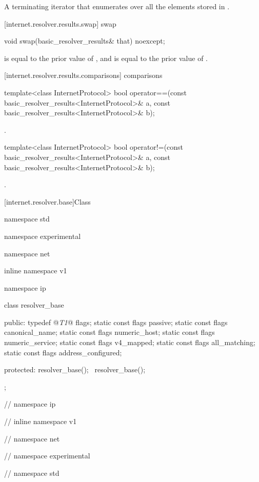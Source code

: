 \begin{itemdescr}
\pnum
\returns A terminating iterator that enumerates over all the  elements stored in .
\end{itemdescr}



[internet.resolver.results.swap]{ swap}

\begin{itemdecl}
void swap(basic_resolver_results& that) noexcept;
\end{itemdecl}

\begin{itemdescr}
\pnum
\postconditions {} is equal to the prior value of , and  is equal to the prior value of .
\end{itemdescr}



[internet.resolver.results.comparisons]{ comparisons}

\begin{itemdecl}
template<class InternetProtocol>
  bool operator==(const basic_resolver_results<InternetProtocol>& a,
                  const basic_resolver_results<InternetProtocol>& b);
\end{itemdecl}

\begin{itemdescr}
\pnum
\returns {}.
\end{itemdescr}

\begin{itemdecl}
template<class InternetProtocol>
  bool operator!=(const basic_resolver_results<InternetProtocol>& a,
                  const basic_resolver_results<InternetProtocol>& b);
\end{itemdecl}

\begin{itemdescr}
\pnum
\returns {}.
\end{itemdescr}




[internet.resolver.base]{Class }

\begin{codeblock}
namespace std {
namespace experimental {
namespace net {
inline namespace v1 {
namespace ip {

  class resolver_base
  {
  public:
    typedef @\textit{T1}@ flags;
    static const flags passive;
    static const flags canonical_name;
    static const flags numeric_host;
    static const flags numeric_service;
    static const flags v4_mapped;
    static const flags all_matching;
    static const flags address_configured;

  protected:
    resolver_base();
    ~resolver_base();
  };

} // namespace ip
} // inline namespace v1
} // namespace net
} // namespace experimental
} // namespace std
\end{codeblock}

